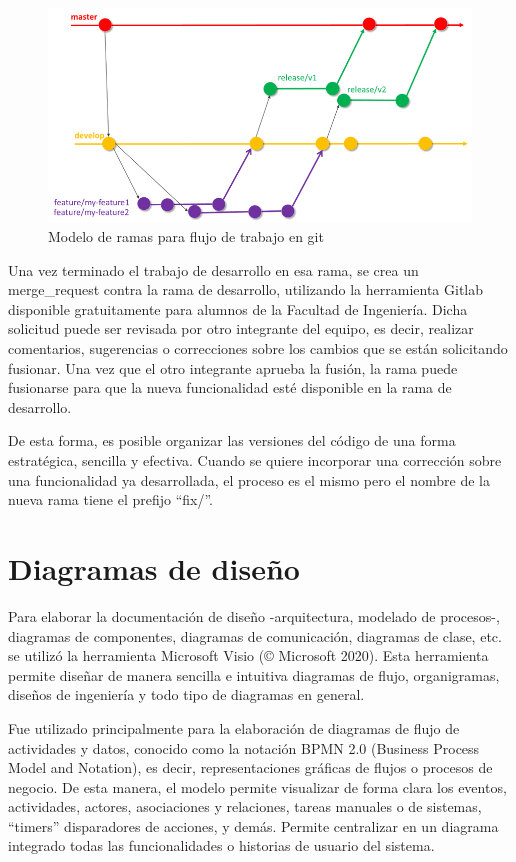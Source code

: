 \begin{figure}[H]
\includegraphics[width=\textwidth]{TESIS/imagenes/chap04/gitflow-branching-model.png}
\caption{ Modelo de ramas para flujo de trabajo en git  }
\label{fig:branching-model}
\end{figure}

Una vez terminado el trabajo de desarrollo en esa rama, se crea un \gls{merge_request} contra la rama de desarrollo, utilizando la herramienta Gitlab disponible gratuitamente para alumnos de la Facultad de Ingeniería. Dicha solicitud puede ser revisada por otro integrante del equipo, es decir, realizar comentarios, sugerencias o correcciones sobre los cambios que se están solicitando fusionar. Una vez que el otro integrante aprueba la fusión, la rama puede fusionarse para que la nueva funcionalidad esté disponible en la rama de desarrollo. 

De esta forma, es posible organizar las versiones del código de una forma estratégica, sencilla y efectiva. Cuando se quiere incorporar una corrección sobre una funcionalidad ya desarrollada, el proceso es el mismo pero el nombre de la nueva rama tiene el prefijo ``fix/''.

\section{Diagramas de diseño}

Para elaborar la documentación de diseño -arquitectura, modelado de procesos-, diagramas de componentes, diagramas de comunicación, diagramas de clase, etc. se utilizó la herramienta Microsoft Visio (© Microsoft 2020). Esta herramienta permite diseñar de manera sencilla e intuitiva diagramas de flujo, organigramas, diseños de ingeniería y todo tipo de diagramas en general. 

Fue utilizado principalmente para la elaboración de diagramas de flujo de actividades y datos, conocido como la notación BPMN 2.0 (Business Process Model and Notation), es decir, representaciones gráficas de flujos o procesos de negocio. De esta manera, el modelo permite visualizar de forma clara los eventos, actividades, actores, asociaciones y relaciones, tareas manuales o de sistemas, ``timers'' disparadores de acciones, y demás. Permite centralizar en un diagrama integrado todas las funcionalidades o historias de usuario del sistema.


